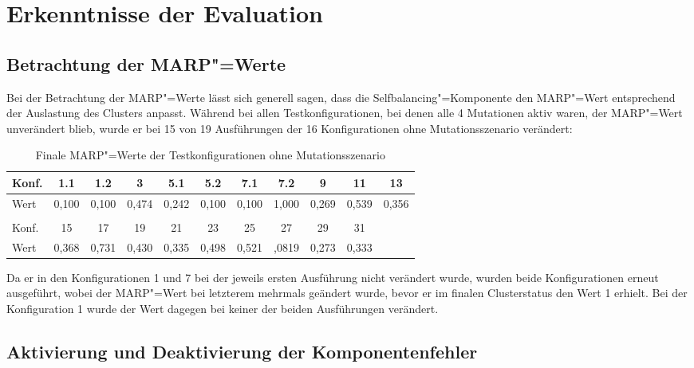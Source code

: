 \section{Erkenntnisse der Evaluation}
\label{sec:evaluationResults}


\subsection{Betrachtung der \ac{MARP}"=Werte}
\label{sec:marpValueResults}

Bei der Betrachtung der \ac{MARP}"=Werte lässt sich generell sagen, dass die Selfbalancing"=Komponente den \ac{MARP}"=Wert entsprechend der Auslastung des Clusters anpasst.
Während bei allen Testkonfigurationen, bei denen alle 4 Mutationen aktiv waren, der \ac{MARP}"=Wert unverändert blieb, wurde er bei 15 von 19 Ausführungen der 16 Konfigurationen ohne Mutationsszenario verändert:

\begin{table}[h]
    \begin{tabular}{l|c|c|c|c|c|c|c|c|c|c}
    	Konf. &  1.1  &  1.2  &   3   &  5.1  &  5.2  &  7.1  &  7.2  &   9   &  11   &  13   \\ \hline
    	Wert     & 0,100 & 0,100 & 0,474 & 0,242 & 0,100 & 0,100 & 1,000 & 0,269 & 0,539 & 0,356 \\
        \multicolumn{11}{c}{} \\
    	Konf. &  15   &  17   &  19   &  21   &  23   &  25   &  27   &  29   &  31   &  \\ \hline
    	Wert     & 0,368 & 0,731 & 0,430 & 0,335 & 0,498 & 0,521 & ,0819 & 0,273 & 0,333 &
    \end{tabular}
    \caption{Finale \ac{MARP}"=Werte der Testkonfigurationen ohne Mutationsszenario}
    \label{tab:finalMarpValues}
\end{table}

Da er in den Konfigurationen 1 und 7 bei der jeweils ersten Ausführung nicht verändert wurde, wurden beide Konfigurationen erneut ausgeführt, wobei der \ac{MARP}"=Wert bei letzterem mehrmals geändert wurde, bevor er im finalen Clusterstatus den Wert 1 erhielt.
Bei der Konfiguration 1 wurde der Wert dagegen bei keiner der beiden Ausführungen verändert.

\subsection{Aktivierung und Deaktivierung der Komponentenfehler}
\label{sec:faultInjectionEval}

